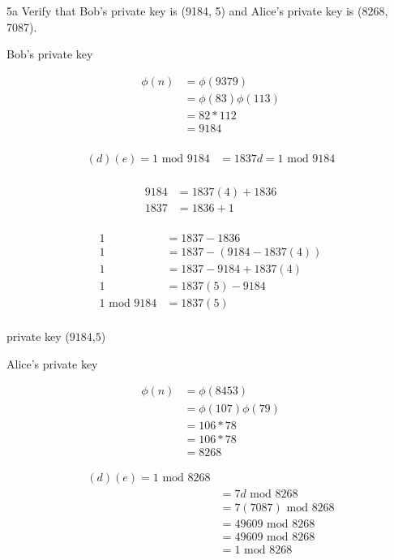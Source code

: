 
\begin{question}{5a}
Verify that Bob's private key is (9184, 5) and Alice's private key is (8268, 7087).

Bob's private key

\begin{align*}
\phi(n) &= \phi(9379)\\
        &= \phi(83)\phi(113)\\
        &= 82*112\\
        &= 9184\\
\end{align*}

\begin{align*}
(d)(e) = 1 \textrm{ mod } 9184 
&= 1837d = 1 \textrm{ mod } 9184 \\
\end{align*}

\begin{align*}
9184 &= 1837(4) + 1836 \\
1837 &= 1836    + 1 \\
\end{align*}

\begin{align*}
1 &= 1837 - 1836\\
1 &= 1837 - (9184 - 1837(4))\\
1 &= 1837 -9184 +1837(4)\\
1 &= 1837(5) -9184\\
1 \textrm{ mod } 9184 &= 1837(5)\\
\end{align*}

private key ($9184$,$5$)

Alice's private key

\begin{align*}
\phi(n) &= \phi(8453)\\
        &= \phi(107)\phi(79)\\
        &= 106*78\\
        &= 106*78\\
        &= 8268
\end{align*}

\begin{align*}
(d)(e) = 1 \textrm{ mod } 8268 \\
&= 7d \textrm{ mod } 8268   \\
&= 7(7087) \textrm{ mod } 8268   \\
&= 49609 \textrm{ mod } 8268   \\
&= 49609 \textrm{ mod } 8268   \\
&= 1 \textrm{ mod } 8268   \\
\end{align*}

\end{question}

